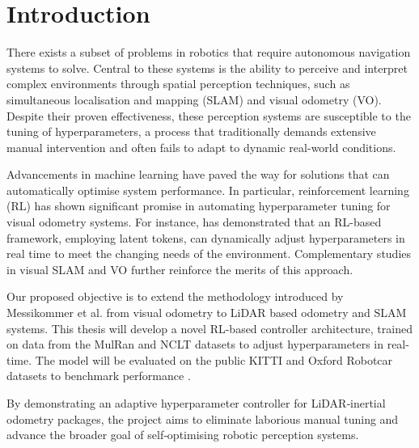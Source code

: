 \documentclass[12pt]{article}
\begin{document}

\tableofcontents
\clearpage

\setlength{\parskip}{\baselineskip}%


\listoffigures

\listoftables

\clearpage


\section{Introduction}
There exists a subset of problems in robotics that require autonomous navigation systems to solve. Central to these systems is the ability to perceive and interpret complex environments through spatial perception techniques, such as simultaneous localisation and mapping (SLAM) and visual odometry (VO). Despite their proven effectiveness, these perception systems are susceptible to the tuning of hyperparameters, a process that traditionally demands extensive manual intervention and often fails to adapt to dynamic real-world conditions.

Advancements in machine learning have paved the way for solutions that can automatically optimise system performance. In particular, reinforcement learning (RL) has shown significant promise in automating hyperparameter tuning for visual odometry systems. For instance, \cite{nicomessikommer_2024_reinforcement} has demonstrated that an RL-based framework, employing latent tokens, can dynamically adjust hyperparameters in real time to meet the changing needs of the environment. Complementary studies in visual SLAM and VO \cite{ma_2025_mambadqn,zhang_2024_efficient} further reinforce the merits of this approach.

Our proposed objective is to extend the methodology introduced by Messikommer et al. \cite{nicomessikommer_2024_reinforcement} from visual odometry to LiDAR based odometry and SLAM systems. This thesis will develop a novel RL-based controller architecture, trained on data from the MulRan and NCLT datasets \cite{kim_2020_mulran, carlevarisbianco_2015_university} to adjust hyperparameters in real-time. The model will be evaluated on the public KITTI and Oxford Robotcar datasets to benchmark performance \cite{geiger_2012_are, maddern_2016_1}.

By demonstrating an adaptive hyperparameter controller for LiDAR‑inertial odometry packages, the project aims to eliminate laborious manual tuning and advance the broader goal of self‑optimising robotic perception systems.
\end{document}
